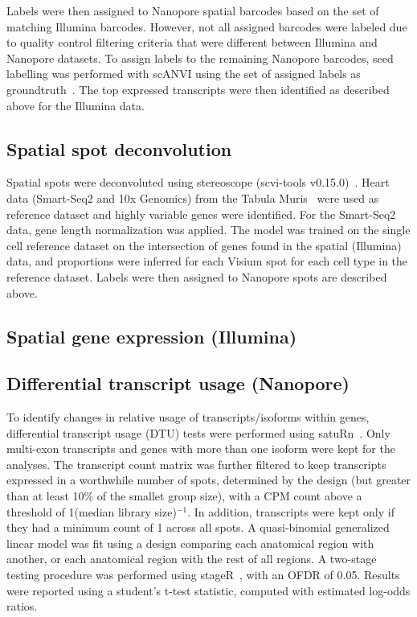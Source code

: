 \documentclass[utf8]{FrontiersinHarvard} %
\begin{document}
Labels were then assigned to Nanopore spatial barcodes based on the set of matching Illumina barcodes. 
However, not all assigned barcodes were labeled due to quality control filtering criteria that were different between Illumina and Nanopore datasets. 
To assign labels to the remaining Nanopore barcodes, seed labelling was performed with scANVI using the set of assigned labels as groundtruth~\citep{Xu2021:scANVI}.
The top expressed transcripts were then identified as described above for the Illumina data.

\subsection*{Spatial spot deconvolution}
Spatial spots were deconvoluted using stereoscope (scvi-tools v0.15.0)~\citep{Andersson2020:stereoscope}. Heart data (Smart-Seq2 and 10x Genomics) from the Tabula Muris~\citep{Schaum2018:Tabula_muris} were used as reference dataset and highly variable genes were identified. For the Smart-Seq2 data, gene length normalization was applied. The model was trained on the single cell reference dataset on the intersection of genes found in the spatial (Illumina) data, and proportions were inferred for each Visium spot for each cell type in the reference dataset. Labels were then assigned to Nanopore spots are described above.

\subsection*{Spatial gene expression (Illumina)}

\subsection*{Differential transcript usage (Nanopore)}
To identify changes in relative usage of transcripts/isoforms within genes, differential transcript usage (DTU) tests were performed using satuRn~\citep{Gilis2021:satuRn}. Only multi-exon transcripts and genes with more than one isoform were kept for the analyses. The transcript count matrix was further filtered to keep transcripts expressed in a worthwhile number of spots, determined by the design (but greater than at least 10\% of the smallet group size), with a CPM count above a threshold of 1(median library size)$^{-1}$. In addition, transcripts were kept only if they had a minimum count of 1 across all spots. A quasi-binomial generalized linear model was fit using a design comparing each anatomical region with another, or each anatomical region with the rest of all regions. A two-stage testing procedure was performed using stageR~\citep{R:stageR}, with an OFDR of 0.05. Results were reported using a student's t-test statistic, computed with estimated log-odds ratios.
\end{document}
